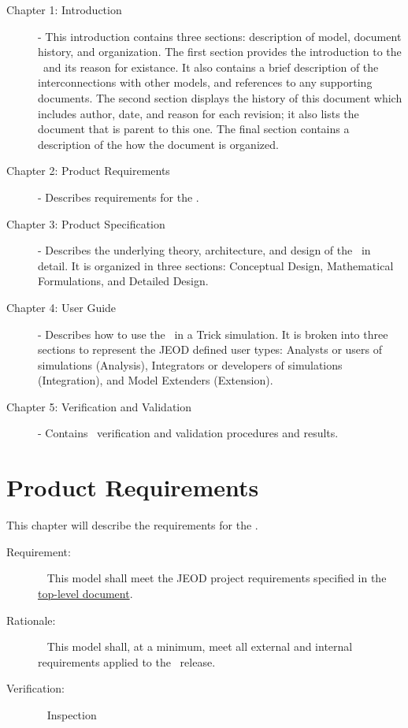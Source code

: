 \begin{description}

\item[Chapter 1: Introduction] -
This introduction contains three sections: description of model, document history, and organization.
The first section provides the introduction to the \atmosphereDesc\ and its reason
for existance.  It also contains a brief description of the interconnections with other models, and
references to any supporting documents.  The second section displays the history of this document which includes
author, date, and reason for each revision; it also lists the document that is parent to this one.  The final
section contains a description of the how the document is organized.

\item[Chapter 2: Product Requirements] -
Describes requirements for the \atmosphereDesc.

\item[Chapter 3: Product Specification] -
Describes the underlying theory, architecture, and design of the \atmosphereDesc\ in detail.  It is organized in
three sections: Conceptual Design, Mathematical Formulations, and Detailed Design.

\item[Chapter 4: User Guide] -
Describes how to use the \atmosphereDesc\ in a Trick simulation.  It is broken into three sections to represent the JEOD
defined user types: Analysts or users of simulations (Analysis), Integrators or developers of simulations (Integration),
and Model Extenders (Extension).

\item[Chapter 5: Verification and Validation] -
Contains \atmosphereDesc\ verification and validation procedures and results.

\end{description}

\chapter{Product Requirements}\label{ch:reqt}

This chapter will describe the requirements for the \atmosphereDesc.

\label{reqt:toplevel}
\begin{description}
\item[Requirement:]\ \newline
  This model shall meet the JEOD project requirements specified in
  the \JEODid\
  \hyperref{file:\JEODHOME/docs/JEOD.pdf}{part1}{reqt}{ top-level
  document}.
\item[Rationale:]\ \newline
  This model shall, at a minimum,  meet all external and internal requirements
  applied to the \JEODid\ release.
\item[Verification:]\ \newline
     Inspection
\end{description}

